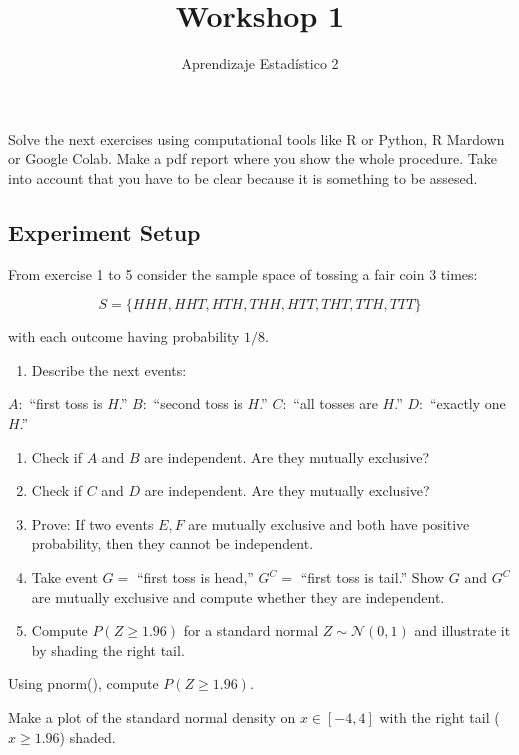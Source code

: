 \documentclass[
  letterpaper,
  DIV=11,
  numbers=noendperiod]{scrartcl}
\title{Workshop 1}
\author{Aprendizaje Estadístico 2}
\date{}
\providecommand{\tightlist}{%
  \setlength{\itemsep}{0pt}\setlength{\parskip}{0pt}}\usepackage{longtable,booktabs,array}
\begin{document}
\maketitle


Solve the next exercises using computational tools like R or Python, R
Mardown or Google Colab. Make a pdf report where you show the whole
procedure. Take into account that you have to be clear because it is
something to be assesed.

\subsection{Experiment Setup}\label{experiment-setup}

From exercise 1 to 5 consider the sample space of tossing a fair coin 3
times:

\[S=\{HHH,HHT,HTH,THH,HTT,THT,TTH,TTT\}\]

with each outcome having probability \(1/8\).

\begin{enumerate}
\def\labelenumi{\arabic{enumi}.}
\tightlist
\item
  Describe the next events:
\end{enumerate}

\(A:\) ``first toss is \(H\).'' \(B:\) ``second toss is \(H\).'' \(C:\)
``all tosses are \(H\).'' \(D:\) ``exactly one \(H\).''

\begin{enumerate}
\def\labelenumi{\arabic{enumi}.}
\setcounter{enumi}{1}
\item
  Check if \(A\) and \(B\) are independent. Are they mutually exclusive?
\item
  Check if \(C\) and \(D\) are independent. Are they mutually exclusive?
\item
  Prove: If two events \(E, F\) are mutually exclusive and both have
  positive probability, then they cannot be independent.
\item
  Take event \(G=\) ``first toss is head,'' \(G^C=\) ``first toss is
  tail.'' Show \(G\) and \(G^C\) are mutually exclusive and compute
  whether they are independent.
\item
  Compute \(P(Z \ge 1.96)\) for a standard normal
  \(Z \sim \mathcal N(0,1)\) and illustrate it by shading the right
  tail.
\end{enumerate}

Using pnorm(), compute \(P(Z \ge 1.96)\).

Make a plot of the standard normal density on \(x \in [-4,4]\) with the
right tail (\(x \ge 1.96\)) shaded.
\end{document}
